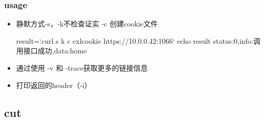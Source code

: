 \documentclass[a4paper,10pt,english]{sphinxmanual}
\begin{document}
\subsubsection{usage}
\label{\detokenize{linux/shell:usage}}\begin{itemize}
\item {} 
静默方式-s，-k不检查证实 -c 创建cookie文件

\begin{sphinxVerbatim}[commandchars=\\\{\}]
result={}`curl \PYGZhy{}s \PYGZhy{}k \PYGZhy{}c cxl\PYGZus{}cookie https://10.0.0.42:1066{}`
 echo \PYGZdl{}result
\PYGZob{}\PYGZdq{}status\PYGZdq{}:0,\PYGZdq{}info\PYGZdq{}:\PYGZdq{}调用接口成功\PYGZdq{},\PYGZdq{}data\PYGZdq{}:\PYGZdq{}home\PYGZdq{}\PYGZcb{}
\end{sphinxVerbatim}

\item {} 
通过使用 -v 和 -trace获取更多的链接信息

\begin{sphinxVerbatim}[commandchars=\\\{\}]
           
\end{sphinxVerbatim}

\item {} 
打印返回的header（-i）

\begin{sphinxVerbatim}[commandchars=\\\{\}]
           
\end{sphinxVerbatim}

\end{itemize}


\subsection{cut}
\label{\detokenize{linux/shell:cut}}
\end{document}

